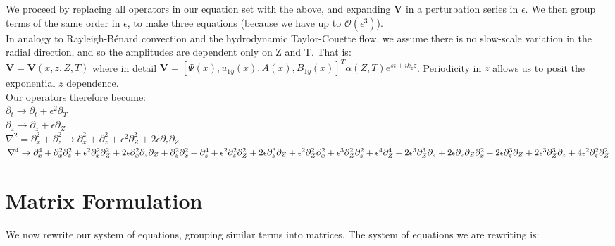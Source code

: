 \documentclass[letterpaper,12pt]{article}
\begin{document}
We proceed by replacing all operators in our equation set with the above, and expanding $\mathbf{V}$ in a perturbation series in $\epsilon$. We then group terms of the same order in $\epsilon$, to make three equations (because we have up to $\mathcal{O}(\epsilon^3)$). \\

In analogy to Rayleigh-B\'enard convection and the hydrodynamic Taylor-Couette flow, we assume there is no slow-scale variation in the radial direction, and so the amplitudes are dependent only on Z and T. That is: \\

$\mathbf{V} = \mathbf{V}\left(x, z, Z, T\right)$ where in detail $\mathbf{V} = \left[\Psi(x), u_{1y}(x), A(x), B_{1y}(x)\right]^T \alpha\left(Z, T\right) e^{st + ik_z z}$. Periodicity in $z$ allows us to posit the exponential $z$ dependence. \\

Our operators therefore become: \\

$\partial_t \to \partial_t + \epsilon^2 \partial_T$ \\

$\partial_z \to \partial_z + \epsilon \partial_Z$ \\

$\nabla^2 = \partial_x^2 + \partial_z^2 \to \partial_x^2  + \partial_z^2 + \epsilon^2 \partial_Z^2 + 2\epsilon\partial_z\partial_Z$ \\

$\nabla^4 \to \partial_x^4 + \partial_x^2\partial_z^2 + \epsilon^2\partial_x^2\partial_Z^2 + 2\epsilon \partial_x^2 \partial_z \partial_Z \\
 + \partial_z^2\partial_x^2 + \partial_z^4 + \epsilon^2\partial_z^2\partial_Z^2 + 2\epsilon\partial_z^3\partial_Z \\
+ \epsilon^2\partial_Z^2\partial_x^2 + \epsilon^3\partial_Z^2\partial_z^2 + \epsilon^4\partial_Z^4 + 2\epsilon^3\partial_Z^3\partial_z \\
+ 2\epsilon\partial_z\partial_Z\partial_x^2 + 2\epsilon\partial_z^3\partial_Z + 2\epsilon^3\partial_Z^3\partial_z + 4\epsilon^2 \partial_z^2 \partial_Z^2$ \\

\section*{Matrix Formulation}

We now rewrite our system of equations, grouping similar terms into matrices. The system of equations we are rewriting is: \\
\end{document}
